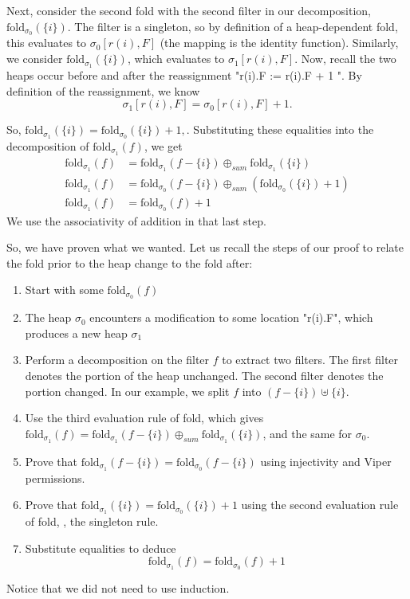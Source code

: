 \documentclass[msc,oneside]{ubcthesis}
\begin{document}
Next, consider the second fold with the second filter in our decomposition, $\textrm{fold}_{\sigma_0}(\{i\})$. The filter is a singleton, so by definition of a heap-dependent fold, this evaluates to $\sigma_0[r(i),F]$ (the mapping is the identity function). Similarly, we consider $\textrm{fold}_{\sigma_1}(\{i\})$, which evaluates to $\sigma_1[r(i),F]$. Now, recall the two heaps occur before and after the reassignment "r(i).F := r(i).F + 1 ". By definition of the reassignment, we know 
$$\sigma_1[r(i),F] = \sigma_0[r(i),F] + 1.$$

So, $\textrm{fold}_{\sigma_1}(\{i\}) = \textrm{fold}_{\sigma_0}(\{i\}) + 1,$. Substituting these equalities into the decomposition of $\textrm{fold}_{\sigma_1}(f)$, we get
\begin{align*} 
\textrm{fold}_{\sigma_1}(f) &= \textrm{fold}_{\sigma_1}(f - \{i\}) \oplus_{sum} \textrm{fold}_{\sigma_1}(\{i\}) \\
\textrm{fold}_{\sigma_1}(f) &= \textrm{fold}_{\sigma_0}(f - \{i\}) \oplus_{sum} (\textrm{fold}_{\sigma_0}(\{i\}) + 1) \\
\textrm{fold}_{\sigma_1}(f) &= \textrm{fold}_{\sigma_0}(f) + 1 
\end{align*}
We use the associativity of addition in that last step. 

So, we have proven what we wanted.
Let us recall the steps of our proof to relate the fold prior to the heap change to the fold after:
\begin{enumerate}
    \item Start with some $\textrm{fold}_{\sigma_0}(f)$
    \item The heap $\sigma_0$ encounters a modification to some location "r(i).F", which produces a new heap $\sigma_1$
    \item Perform a decomposition on the filter $f$ to extract two filters. The first filter denotes the portion of the heap unchanged. The second filter denotes the portion changed. In our example, we split $f$ into $\left( f - \{i\}\right) \uplus \{i\} $.
    \item Use the third evaluation rule of fold, which gives $\textrm{fold}_{\sigma_1}(f) = \textrm{fold}_{\sigma_1}(f - \{i\}) \oplus_{sum} \textrm{fold}_{\sigma_1}(\{i\}) $, and the same for $\sigma_0$.
    \item Prove that $\textrm{fold}_{\sigma_1}(f - \{i\}) = \textrm{fold}_{\sigma_0}(f - \{i\})$ using injectivity and Viper permissions.
    \item Prove that $\textrm{fold}_{\sigma_1}(\{i\}) = \textrm{fold}_{\sigma_0}(\{i\}) + 1$ using the second evaluation rule of fold, \ie, the singleton rule.
    \item Substitute equalities to deduce $$\textrm{fold}_{\sigma_1}(f) = \textrm{fold}_{\sigma_0}(f) + 1$$
\end{enumerate}
Notice that we did not need to use induction. 
\end{document}
